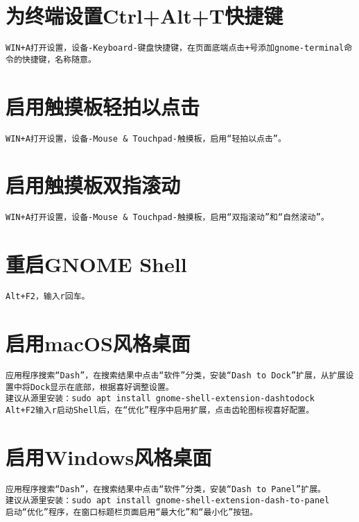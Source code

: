 \documentclass[a4paper,fontset=fandol,zihao=-4,linespread=1.2,oneside]{ctexbook}
\begin{document}
\section{为终端设置Ctrl+Alt+T快捷键}
\begin{lstlisting}
WIN+A打开设置，设备-Keyboard-键盘快捷键，在页面底端点击+号添加gnome-terminal命令的快捷键，名称随意。
\end{lstlisting}

\section{启用触摸板轻拍以点击}
\begin{lstlisting}
WIN+A打开设置，设备-Mouse & Touchpad-触摸板，启用“轻拍以点击”。
\end{lstlisting}

\section{启用触摸板双指滚动}
\begin{lstlisting}
WIN+A打开设置，设备-Mouse & Touchpad-触摸板，启用“双指滚动”和“自然滚动”。
\end{lstlisting}

\section{重启GNOME Shell}
\begin{lstlisting}
Alt+F2，输入r回车。
\end{lstlisting}

\section{启用macOS风格桌面}
\begin{lstlisting}
应用程序搜索“Dash”，在搜索结果中点击“软件”分类，安装“Dash to Dock”扩展，从扩展设置中将Dock显示在底部，根据喜好调整设置。
建议从源里安装：sudo apt install gnome-shell-extension-dashtodock
Alt+F2输入r启动Shell后，在“优化”程序中启用扩展，点击齿轮图标视喜好配置。
\end{lstlisting}

\section{启用Windows风格桌面}
\begin{lstlisting}
应用程序搜索“Dash”，在搜索结果中点击“软件”分类，安装“Dash to Panel”扩展。
建议从源里安装：sudo apt install gnome-shell-extension-dash-to-panel
启动“优化”程序，在窗口标题栏页面启用“最大化”和“最小化”按钮。
\end{lstlisting}
\end{document}
